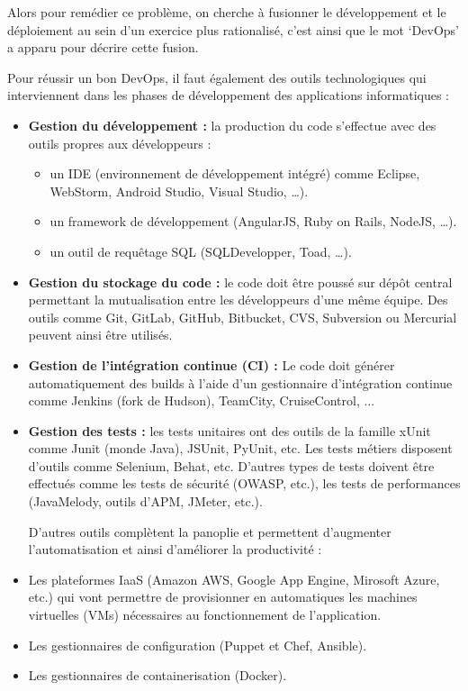 \documentclass[a4paper,11pt,oneside]{report}
\begin{document}
Alors pour remédier ce problème, on cherche à fusionner le développement et le déploiement au sein d'un exercice plus rationalisé, c’est ainsi que le mot ‘DevOps’ a apparu pour décrire cette fusion.
\newline

Pour réussir un bon DevOps, il faut également des outils technologiques qui interviennent dans les phases de développement des applications informatiques :

\begin{itemize}
\item \textbf {Gestion du développement :} la production du code s’effectue avec des outils propres aux développeurs :
\begin{itemize}
\item un IDE (environnement de développement intégré) comme Eclipse, WebStorm, Android Studio, Visual Studio, …).
\item un framework de développement (AngularJS, Ruby on Rails,  NodeJS, …).
\item un outil de requêtage SQL (SQLDevelopper, Toad, …). 
\end{itemize}

\item \textbf {Gestion du stockage du code :} le code doit être poussé sur dépôt central permettant la mutualisation entre les développeurs d’une même équipe. Des outils comme Git, GitLab, GitHub, Bitbucket, CVS, Subversion ou Mercurial peuvent ainsi être utilisés.


\item \textbf {Gestion de l’intégration continue (CI) :} Le code doit générer automatiquement des builds à l’aide d’un gestionnaire d’intégration continue comme Jenkins (fork de Hudson), TeamCity, CruiseControl, ...


\item \textbf {Gestion des tests :} les tests unitaires ont des outils de la famille xUnit comme Junit (monde Java), JSUnit, PyUnit, etc. Les tests métiers disposent d’outils comme Selenium, Behat, etc. D’autres types de tests doivent être effectués comme les tests de sécurité (OWASP, etc.), les tests de performances (JavaMelody, outils d’APM, JMeter, etc.).
\newline

D’autres outils complètent la panoplie et permettent d’augmenter l’automatisation et ainsi d’améliorer la productivité :

\item Les plateformes IaaS (Amazon AWS, Google App Engine, Mirosoft Azure, etc.) qui vont permettre de provisionner en automatiques les machines virtuelles (VMs) nécessaires au fonctionnement de l’application.
\item Les gestionnaires de configuration (Puppet et Chef, Ansible).
\item Les gestionnaires de containerisation (Docker).
\end{itemize}
\end{document}
